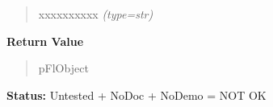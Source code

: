 \begin{boxedminipage}{\funcwidth}
\begin{quote}
\begin{Ventry}{xxxxxxxxxx}
            {\it (type=str)}

        \end{Ventry}

      \end{quote}

      \textbf{Return Value}
    \vspace{-1ex}

      \begin{quote}
      pFlObject

      \end{quote}

\textbf{Status:} Untested + NoDoc + NoDemo = NOT OK



    \end{boxedminipage}

    \label{xformslib:flbutton:fl_add_labelbutton}

    \vspace{0.5ex}

